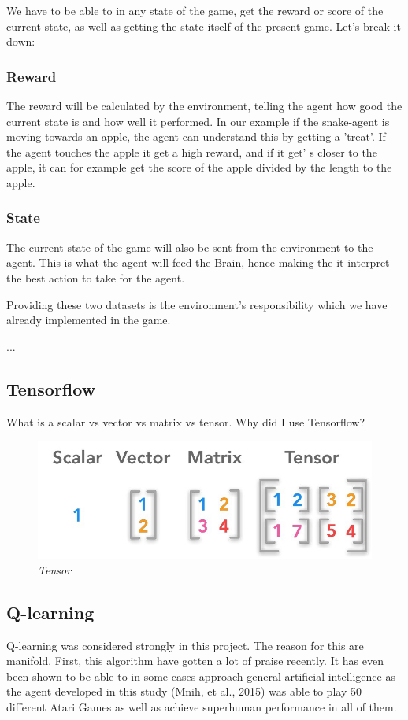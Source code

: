 \documentclass[
a4paper,
11pt,
english
]{report}
\begin{document}
We have to be able to in any state of the game, get the reward or score of the current state, as well as getting the state itself of the present game. Let's break it down:

\subsubsection{Reward}
The reward will be calculated by the environment, telling the agent how good the current state is and how well it performed. In our example if the snake-agent is moving towards an apple, the agent can understand this by getting a 'treat'. If the agent touches the apple it get a high reward, and if it get'
s closer to the apple, it can for example get the score of the apple divided by the length to the apple.

\subsubsection{State}
The current state of the game will also be sent from the environment to the agent. This is what the agent will feed the Brain, hence making the it interpret the best action to take for the agent.

Providing these two datasets is the environment's responsibility which we have already implemented in the game.


...

\subsection{Tensorflow}
What is a scalar vs vector vs matrix vs tensor.
Why did I use Tensorflow?

\begin{figure}[h]
    \centering
    \includegraphics[width=.7\textwidth]{tensor}
    \caption{\textit{Tensor}}
    \label{fig:tensor}
\end{figure}

\subsection{Q-learning}
Q-learning was considered strongly in this project. The reason for this are manifold. First, this algorithm have gotten a lot of praise recently. It has even been shown to be able to in some cases approach general artificial intelligence as the agent developed in this study (Mnih, et al., 2015) was able to play 50 different Atari Games as well as achieve superhuman performance in all of them.
\end{document}
